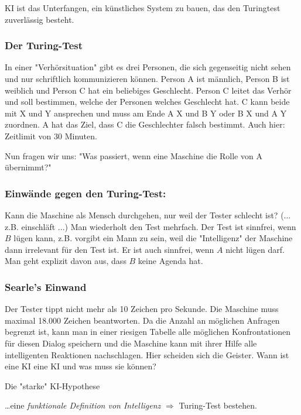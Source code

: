 \documentclass[runningheads]{llncs}
\begin{document}
KI ist das Unterfangen, ein künstliches System zu bauen, das den Turingtest zuverlässig besteht.

\subsubsection{Der Turing-Test}
In einer "Verhörsituation" gibt es drei Personen, die sich gegenseitig nicht sehen und nur schriftlich kommunizieren können. Person A ist männlich, Person B ist weiblich und Person C hat ein beliebiges Geschlecht. Person C leitet das Verhör und soll bestimmen, welche der Personen welches Geschlecht hat. C kann beide mit X und Y ansprechen und muss am Ende A X und B Y oder B X und A Y zuordnen. A hat das Ziel, dass C die Geschlechter falsch bestimmt. Auch hier: Zeitlimit von 30 Minuten.

Nun fragen wir uns: "Was passiert, wenn eine Maschine die Rolle von A übernimmt?" 

\subsubsection{Einwände gegen den Turing-Test:}

Kann die Maschine als Mensch durchgehen, nur weil der Tester schlecht ist? (... z.B. einschläft ...) Man wiederholt den Test mehrfach. Der Test ist sinnfrei, wenn $B$ lügen kann, z.B. vorgibt ein Mann zu sein, weil die "Intelligenz" der Maschine dann irrelevant für den Test ist. Er ist auch sinnfrei, wenn $A$ nicht lügen darf. Man geht explizit davon aus, dass $B$ keine Agenda hat.

\subsubsection{Searle's Einwand}

Der Tester tippt nicht mehr als 10 Zeichen pro Sekunde. Die Maschine muss maximal 18.000 Zeichen beantworten. Da die Anzahl an möglichen Anfragen begrenzt ist, kann man in einer riesigen Tabelle alle möglichen Konfrontationen für diesen Dialog speichern und die Maschine kann mit ihrer Hilfe alle intelligenten Reaktionen nachschlagen. Hier scheiden sich die Geister. Wann ist eine KI eine KI und was muss sie können?


\begin{definition}{Die "starke" KI-Hypothese}

\dots eine \textit{funktionale Definition von Intelligenz} $\Rightarrow$ Turing-Test bestehen.

\end{definition}
\end{document}
